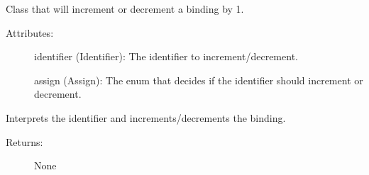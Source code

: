 \documentclass[letterpaper,10pt,english]{sphinxmanual}
\begin{document}
\begin{fulllineitems}
\label{\detokenize{statements:robol_lang.statements.Assignment}}
\sphinxAtStartPar
Class that will increment or decrement a binding by 1.
\begin{description}
\item[{Attributes:}] \leavevmode
\sphinxAtStartPar
identifier (Identifier): The identifier to increment/decrement.

\sphinxAtStartPar
assign (Assign): The enum that decides if the identifier should
increment or decrement.

\end{description}

\begin{fulllineitems}
\label{\detokenize{statements:robol_lang.statements.Assignment.interpret}}
\sphinxAtStartPar
Interprets the identifier and increments/decrements the binding.
\begin{description}
\item[{Returns:}] \leavevmode
\sphinxAtStartPar
None

\end{description}

\end{fulllineitems}


\end{fulllineitems}

\end{document}
